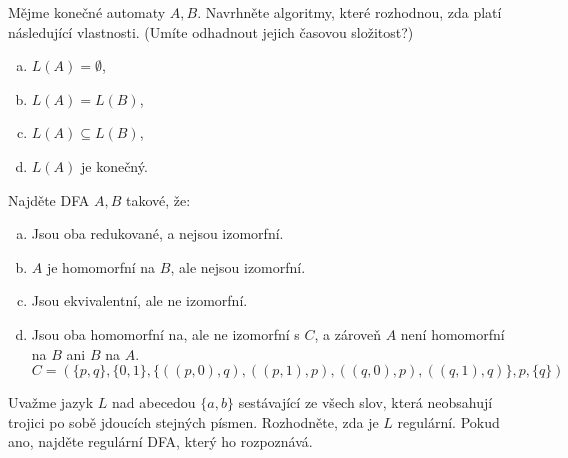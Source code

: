 \documentclass[a4paper,12pt]{amsart}
\begin{document}
\begin{problem}
\begin{multicols}{3}
    \end{multicols}

\end{problem}


\medskip\begin{problem}

    Mějme konečné automaty $A,B$. Navrhněte algoritmy, které rozhodnou, zda platí následující vlastnosti. (Umíte odhadnout jejich časovou složitost?)

    \medskip
    
    \begin{multicols}{2}
    
        \begin{enumerate}[(a)]\setlength\itemsep{12pt}
            \item $L(A)=\emptyset$,
            \item $L(A)=L(B)$,
            \item $L(A)\subseteq L(B)$,
            \item $L(A)$ je konečný.
        \end{enumerate}

    \end{multicols}

\end{problem}


\medskip\begin{problem}

    Najděte DFA $A,B$ takové, že:  

    \begin{enumerate}[(a)]\setlength\itemsep{12pt}
        \item Jsou oba redukované, a nejsou izomorfní. 
        \item $A$ je homomorfní na $B$, ale nejsou izomorfní.
        \item Jsou ekvivalentní, ale ne izomorfní.
        \item Jsou oba homomorfní na, ale ne izomorfní s $C$, a zároveň $A$ není homomorfní na $B$ ani $B$ na $A$.
        $$
        C=(\{p,q\},\{0,1\},\{((p,0),q),((p,1),p),((q,0),p),((q,1),q)\},p,\{q\})
        $$
    \end{enumerate}

\end{problem}


\medskip\begin{problem}
    
   Uvažme jazyk $L$ nad abecedou $\{a,b\}$ sestávající ze všech slov, která neobsahují trojici po sobě jdoucích stejných písmen. Rozhodněte, zda je $L$ regulární. Pokud ano, najděte regulární DFA, který ho rozpoznává.

\end{problem}
\end{document}
